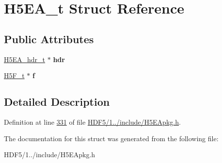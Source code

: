 \hypertarget{struct_h5_e_a__t}{}\section{H5\+E\+A\+\_\+t Struct Reference}
\label{struct_h5_e_a__t}
\subsection*{Public Attributes}
\begin{DoxyCompactItemize}
\item 
\mbox{\label{struct_h5_e_a__t_ab2d627325341a31ea6480c12f5a02cdd}} 
\hyperlink{struct_h5_e_a__hdr__t}{H5\+E\+A\+\_\+hdr\+\_\+t} $\ast$ {\bfseries hdr}
\item 
\mbox{\label{struct_h5_e_a__t_a57d8f3f278a96e219b2675fa78ce4edc}} 
\hyperlink{struct_h5_f__t}{H5\+F\+\_\+t} $\ast$ {\bfseries f}
\end{DoxyCompactItemize}


\subsection{Detailed Description}


Definition at line \hyperlink{_h_d_f5_21_810_81_2include_2_h5_e_apkg_8h_source_l00331}{331} of file \hyperlink{_h_d_f5_21_810_81_2include_2_h5_e_apkg_8h_source}{H\+D\+F5/1../include/\+H5\+E\+Apkg.\+h}.



The documentation for this struct was generated from the following file\+:\begin{DoxyCompactItemize}
\item 
H\+D\+F5/1../include/\+H5\+E\+Apkg.\+h\end{DoxyCompactItemize}
